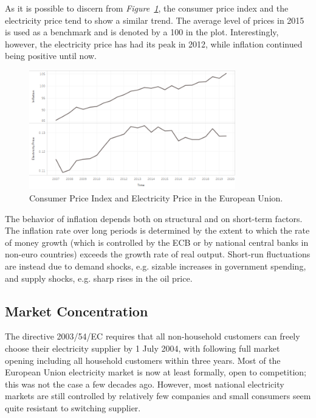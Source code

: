 \documentclass[a4paper,12pt]{book}
\begin{document}
As it is possible to discern from \textit{Figure~\ref{fig:infl}}, the consumer price index and the electricity price tend to show a similar trend. The average level of prices in 2015 is used as a benchmark and is denoted by a 100 in the plot. Interestingly, however, the electricity price has had its peak in 2012, while inflation continued being positive until now. 

\begin{figure}[tb]
\begin{center}
\captionsetup{justification=centering}
\includegraphics[width=0.8\textwidth]{Images/inf.png}
\caption{Consumer Price Index and Electricity Price in the European Union.}
\label{fig:infl}
\end{center}
\end{figure}

The behavior of inflation depends both on structural and on short-term factors. The inflation rate over long periods is determined by the extent to which the rate of money growth (which is controlled by the ECB or by national central banks in non-euro countries) exceeds the growth rate of real output. Short-run fluctuations are instead due to demand shocks, e.g. sizable increases in government spending, and supply shocks, e.g. sharp rises in the oil price.~\cite{ball1993causes}

\subsection{Market Concentration}

The directive 2003/54/EC requires that all non-household customers can freely choose their electricity supplier by 1 July 2004, with following full market opening including all household customers within three years. Most of the European Union electricity market is now at least formally, open to competition; this was not the case a few decades ago. However, most national electricity markets are still controlled by relatively few companies and small consumers seem quite resistant to switching supplier.~\cite{jamasb2005electricity}
\end{document}
